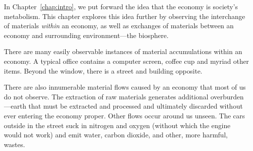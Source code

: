 
In Chapter~\ref{chap:intro}, we put forward the idea that 
the economy is society's metabolism.
This chapter explores
this idea further by observing the interchange of materials \emph{within}
an economy, as well as exchanges of materials between an economy and 
surrounding environment---the biosphere. 


 

There are many easily observable instances 
of material accumulations
within an economy. 
A typical office contains a computer screen, coffee cup
and myriad other items. 
Beyond the window, there is a street and building
opposite. 

There are also innumerable material flows caused by an economy 
that most of us do not observe.
The extraction of raw materials generates additional overburden---earth that must be
extracted and processed and ultimately discarded without ever entering the economy
proper. 
Other flows occur around us unseen. 
The cars outside in the street suck in nitrogen and oxygen 
(without which the engine would not work) 
and emit water, carbon dioxide, and
other, more harmful, wastes. 

